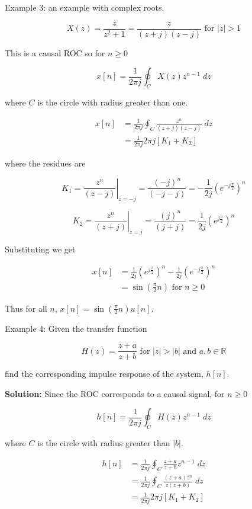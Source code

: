 \documentclass{article}
\begin{document}
Example 3: an example with complex roots.

$$
X(z) = \frac{z}{z^2 + 1} = \frac{z}{(z+j)(z-j)} \text{ for } |z| > 1
$$

This is a causal ROC so for $n \geq 0$

$$
x[n] = \frac{1}{2\pi j} \oint_C X(z) z^{n-1}\; dz
$$

where $C$ is the circle with radius greater than one.

$$
\begin{aligned}
  x[n] &= \frac{1}{2\pi j} \oint_C \frac{z^n}{(z+j)(z-j)}\; dz\\
  &= \frac{1}{2\pi j} 2\pi j[K_1 + K_2] 
\end{aligned}
$$

where the residues are

$$
K_1 = \left. \frac{z^n}{(z-j)} \right|_{z = -j} = \frac{(-j)^n}{(-j-j)} = -\frac{1}{2j} \left(e^{-j\frac{\pi}{2}}\right)^n 
$$

$$
K_2 = \left. \frac{z^n}{(z+j)} \right|_{z = j} = \frac{(j)^n}{(j+j)} = \frac{1}{2j} \left(e^{j\frac{\pi}{2}}\right)^n 
$$

Substituting we get

$$
\begin{aligned}
  x[n] &= \frac{1}{2j} \left(e^{j\frac{\pi}{2}}\right)^n -\frac{1}{2j} \left(e^{-j\frac{\pi}{2}}\right)^n\\
  &= \sin\left(\frac{\pi}{2}n \right) \text{ for } n \geq 0
\end{aligned}
$$

Thus for all $n$, $x[n] = \sin\left(\frac{\pi}{2}n \right) u[n]$.

Example 4: Given the transfer function

$$
H(z) = \frac{z+a}{z+b} \text{ for } |z| > |b| \text{ and } a,b\in\mathbb{R}
$$

find the corresponding impulse response of the system, $h[n]$.

\textbf{Solution:} Since the ROC corresponds to a causal signal, for $n \geq 0$

$$
h[n] = \frac{1}{2\pi j} \oint_C H(z) z^{n-1}\; dz
$$

where $C$ is the circle with radius greater than $|b|$.

$$
\begin{aligned}
  h[n] &= \frac{1}{2\pi j} \oint_C \frac{z+a}{z+b} z^{n-1}\; dz\\
  &= \frac{1}{2\pi j} \oint_C \frac{(z+a)z^n}{z(z+b)}\; dz\\
  &= \frac{1}{2\pi j} 2\pi j [K_1 + K_2]
\end{aligned}
$$
\end{document}
